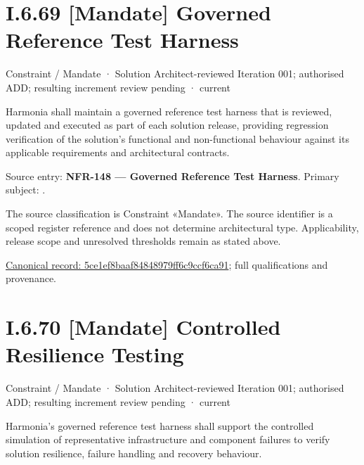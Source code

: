 \section*{I.6.69 [Mandate] Governed Reference Test Harness}
\label{navigation:I.6.69}

\label{element:5ce1ef8baaf84848979ff6c9ccf6ca91}
{\small Constraint / Mandate · Solution Architect-reviewed Iteration 001; authorised ADD; resulting increment review pending · current}\par

Harmonia shall maintain a governed reference test harness that is reviewed, updated and executed as part of each solution release, providing regression verification of the solution's functional and non-functional behaviour against its applicable requirements and architectural contracts.



Source entry: \textbf{NFR-148 — Governed Reference Test Harness}. Primary subject: \texttt{}.



The source classification is Constraint «Mandate». The source identifier is a scoped register reference and does not determine architectural type. Applicability, release scope and unresolved thresholds remain as stated above.


{\footnotesize \href{../../../../../../../../continuum/motivation/constraint/mandate/5ce1ef8baaf84848979ff6c9ccf6ca91.md}{Canonical record: 5ce1ef8baaf84848979ff6c9ccf6ca91}; full qualifications and provenance.}\par
\section*{I.6.70 [Mandate] Controlled Resilience Testing}
\label{navigation:I.6.70}

\label{element:f2d38e7beef84b61a769de4ca7f48951}
{\small Constraint / Mandate · Solution Architect-reviewed Iteration 001; authorised ADD; resulting increment review pending · current}\par

Harmonia's governed reference test harness shall support the controlled simulation of representative infrastructure and component failures to verify solution resilience, failure handling and recovery behaviour.



